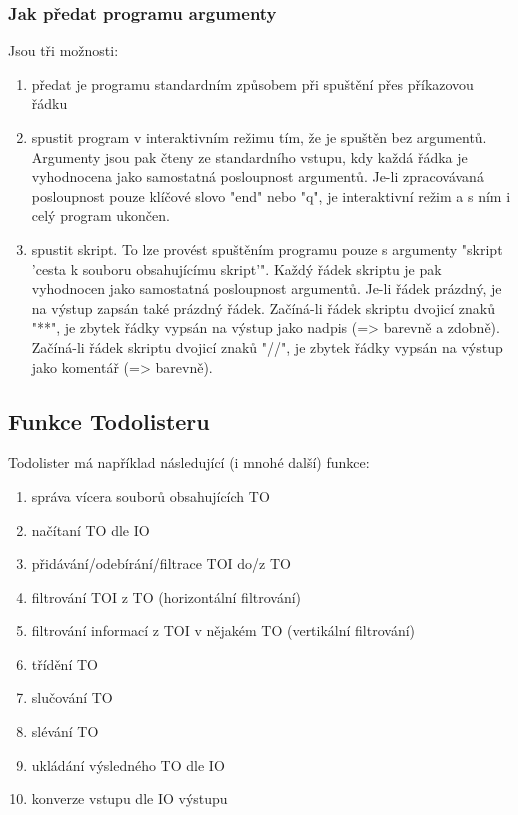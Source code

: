\documentclass[11pt]{article}
\begin{document}
\subsubsection{Jak předat programu argumenty}
Jsou tři možnosti:
\begin{enumerate}[leftmargin=5mm]
\item předat je programu standardním způsobem při spuštění přes příkazovou řádku
\item spustit program v interaktivním režimu tím, že je spuštěn bez argumentů. Argumenty jsou pak čteny ze standardního vstupu, kdy každá řádka je vyhodnocena jako samostatná posloupnost argumentů. Je-li zpracovávaná posloupnost pouze klíčové slovo "end" nebo "q", je interaktivní režim a s ním i celý program ukončen.
\item spustit skript. To lze provést spuštěním programu pouze s argumenty "skript 'cesta k souboru obsahujícímu skript'". Každý řádek skriptu je pak vyhodnocen jako samostatná posloupnost argumentů. Je-li řádek prázdný, je na výstup zapsán také prázdný řádek. Začíná-li řádek skriptu dvojicí znaků "**", je zbytek řádky vypsán na výstup jako nadpis (=> barevně a zdobně). Začíná-li řádek skriptu dvojicí znaků "//", je zbytek řádky vypsán na výstup jako komentář (=> barevně).
\end{enumerate}

\subsection{Funkce Todolisteru}
Todolister má například následující (i mnohé další) funkce:
\begin{enumerate}[leftmargin=5mm]
\item správa vícera souborů obsahujících TO
\item načítaní TO dle IO
\item přidávání/odebírání/filtrace TOI do/z TO
\item filtrování TOI z TO (horizontální filtrování)
\item filtrování informací z TOI v nějakém TO (vertikální filtrování)
\item třídění TO
\item slučování TO
\item slévání TO
\item ukládání výsledného TO dle IO
\item konverze vstupu dle IO výstupu
\end{enumerate}
\end{document}
